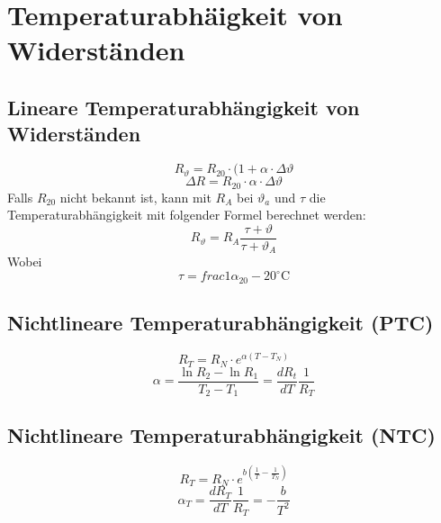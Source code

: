 



\section{Temperaturabhäigkeit von Widerständen}

\subsection{Lineare Temperaturabhängigkeit von Widerständen}
\[ R_\vartheta = R_{20} \cdot (1 + \alpha \cdot \Delta \vartheta \]
\[ \Delta R = R_{20} \cdot \alpha \cdot \Delta \vartheta \]
Falls $R_20$ nicht bekannt ist, kann mit $R_A$ bei $\vartheta_a$ und $\tau$ die Temperaturabhängigkeit mit folgender Formel berechnet werden:  \[ R_\vartheta = R_A \frac{\tau + \vartheta}{\tau + \vartheta_A} \]
Wobei 
\[ \tau = frac{1}{\alpha_20} - 20^{\circ}\text{C} \]

\subsection{Nichtlineare Temperaturabhängigkeit (PTC)}
\[ R_T = R_N \cdot e^{\alpha (T - T_N)} \]
\[ \alpha = \frac{\ln R_2 - \ln R_1}{T_2 - T_1} = \frac{d R_t}{d T}\frac{1}{R_T} \]

\subsection{Nichtlineare Temperaturabhängigkeit (NTC)}
\[ R_T = R_N \cdot e^{b\left(\frac{1}{T} - \frac{1}{T_N}\right)} \]
\[ \alpha_T = \frac{d R_T}{d T}\frac{1}{R_T} = -\frac{b}{T^2} \]